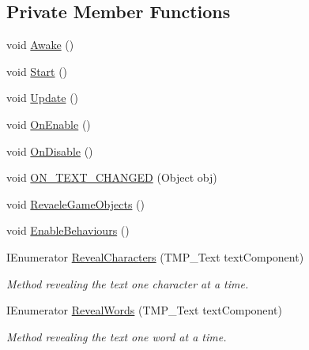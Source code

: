 \subsection*{Private Member Functions}
\begin{DoxyCompactItemize}
\item 
void \mbox{\hyperlink{class_text_console_simulator_aa4d09e387a08d3301c3997762bd9536d}{Awake}} ()
\item 
void \mbox{\hyperlink{class_text_console_simulator_a9e43e79bb6b5c9b3ecfa426ded2a7995}{Start}} ()
\item 
void \mbox{\hyperlink{class_text_console_simulator_a3ba3d788ab24c2b0d5949e5f34992b45}{Update}} ()
\item 
void \mbox{\hyperlink{class_text_console_simulator_af32c7062f7ff475db935b844fa00927a}{On\+Enable}} ()
\item 
void \mbox{\hyperlink{class_text_console_simulator_a0ba30e1537527a205ce4870e7132ed24}{On\+Disable}} ()
\item 
void \mbox{\hyperlink{class_text_console_simulator_adcb9117e3ef855ea84c1d5cea9c40e0f}{O\+N\+\_\+\+T\+E\+X\+T\+\_\+\+C\+H\+A\+N\+G\+ED}} (Object obj)
\item 
void \mbox{\hyperlink{class_text_console_simulator_ad7cf321e68b408092040fd1a6c2096cd}{Revaele\+Game\+Objects}} ()
\item 
void \mbox{\hyperlink{class_text_console_simulator_a00f1a84f3b64fdc61d2b5dc4ec22b8b5}{Enable\+Behaviours}} ()
\item 
I\+Enumerator \mbox{\hyperlink{class_text_console_simulator_a6740593a0a66d052b4bc2076b0032d96}{Reveal\+Characters}} (T\+M\+P\+\_\+\+Text text\+Component)
\begin{DoxyCompactList}\small\item\em Method revealing the text one character at a time. \end{DoxyCompactList}\item 
I\+Enumerator \mbox{\hyperlink{class_text_console_simulator_a02b5d223477f40d452dc46d86f55376f}{Reveal\+Words}} (T\+M\+P\+\_\+\+Text text\+Component)
\begin{DoxyCompactList}\small\item\em Method revealing the text one word at a time. \end{DoxyCompactList}\end{DoxyCompactItemize}
